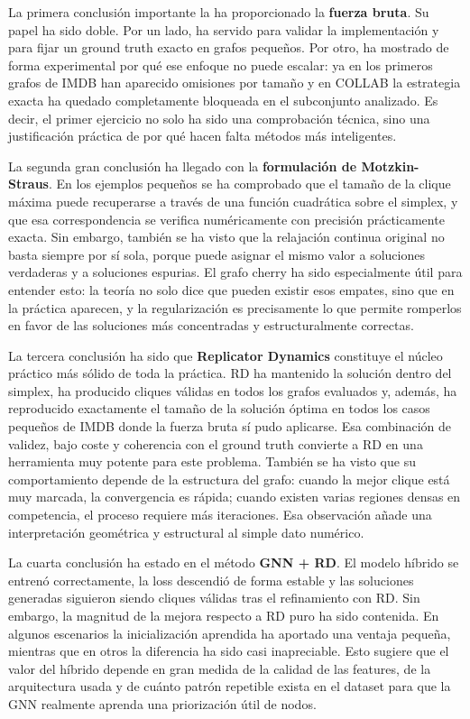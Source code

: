 \documentclass[11pt]{article}
\begin{document}
La primera conclusión importante la ha proporcionado la \textbf{fuerza
bruta}. Su papel ha sido doble. Por un lado, ha servido para validar la
implementación y para fijar un ground truth exacto en grafos pequeños.
Por otro, ha mostrado de forma experimental por qué ese enfoque no puede
escalar: ya en los primeros grafos de IMDB han aparecido omisiones por
tamaño y en COLLAB la estrategia exacta ha quedado completamente
bloqueada en el subconjunto analizado. Es decir, el primer ejercicio no
solo ha sido una comprobación técnica, sino una justificación práctica
de por qué hacen falta métodos más inteligentes.

La segunda gran conclusión ha llegado con la \textbf{formulación de
Motzkin-Straus}. En los ejemplos pequeños se ha comprobado que el tamaño
de la clique máxima puede recuperarse a través de una función cuadrática
sobre el simplex, y que esa correspondencia se verifica numéricamente
con precisión prácticamente exacta. Sin embargo, también se ha visto que
la relajación continua original no basta siempre por sí sola, porque
puede asignar el mismo valor a soluciones verdaderas y a soluciones
espurias. El grafo cherry ha sido especialmente útil para entender esto:
la teoría no solo dice que pueden existir esos empates, sino que en la
práctica aparecen, y la regularización es precisamente lo que permite
romperlos en favor de las soluciones más concentradas y estructuralmente
correctas.

La tercera conclusión ha sido que \textbf{Replicator Dynamics}
constituye el núcleo práctico más sólido de toda la práctica. RD ha
mantenido la solución dentro del simplex, ha producido cliques válidas
en todos los grafos evaluados y, además, ha reproducido exactamente el
tamaño de la solución óptima en todos los casos pequeños de IMDB donde
la fuerza bruta sí pudo aplicarse. Esa combinación de validez, bajo
coste y coherencia con el ground truth convierte a RD en una herramienta
muy potente para este problema. También se ha visto que su
comportamiento depende de la estructura del grafo: cuando la mejor
clique está muy marcada, la convergencia es rápida; cuando existen
varias regiones densas en competencia, el proceso requiere más
iteraciones. Esa observación añade una interpretación geométrica y
estructural al simple dato numérico.

La cuarta conclusión ha estado en el método \textbf{GNN + RD}. El modelo
híbrido se entrenó correctamente, la loss descendió de forma estable y
las soluciones generadas siguieron siendo cliques válidas tras el
refinamiento con RD. Sin embargo, la magnitud de la mejora respecto a RD
puro ha sido contenida. En algunos escenarios la inicialización
aprendida ha aportado una ventaja pequeña, mientras que en otros la
diferencia ha sido casi inapreciable. Esto sugiere que el valor del
híbrido depende en gran medida de la calidad de las features, de la
arquitectura usada y de cuánto patrón repetible exista en el dataset
para que la GNN realmente aprenda una priorización útil de nodos.
\end{document}
